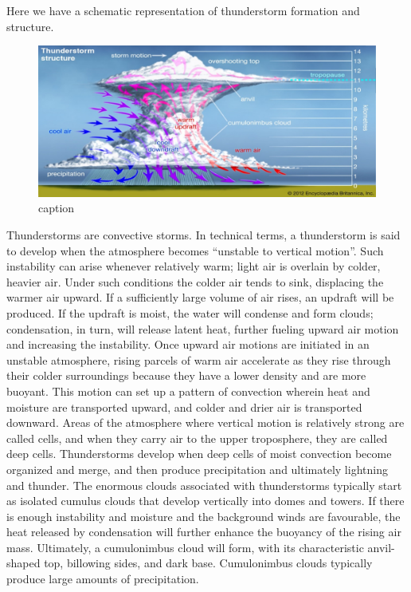 \documentclass[12pt,oneside]{book}
\begin{document}
Here we have a schematic representation of thunderstorm formation and
structure.

\begin{figure}

{\centering \includegraphics[width=0.8\linewidth]{figures/FigureE1} 

}

\caption{caption}\label{fig:Thunderstormformation}
\end{figure}

Thunderstorms are convective storms. In technical terms, a thunderstorm
is said to develop when the atmosphere becomes ``unstable to vertical
motion''. Such instability can arise whenever relatively warm; light air
is overlain by colder, heavier air. Under such conditions the colder air
tends to sink, displacing the warmer air upward. If a sufficiently large
volume of air rises, an updraft will be produced. If the updraft is
moist, the water will condense and form clouds; condensation, in turn,
will release latent heat, further fueling upward air motion and
increasing the instability. Once upward air motions are initiated in an
unstable atmosphere, rising parcels of warm air accelerate as they rise
through their colder surroundings because they have a lower density and
are more buoyant. This motion can set up a pattern of convection wherein
heat and moisture are transported upward, and colder and drier air is
transported downward. Areas of the atmosphere where vertical motion is
relatively strong are called cells, and when they carry air to the upper
troposphere, they are called deep cells. Thunderstorms develop when deep
cells of moist convection become organized and merge, and then produce
precipitation and ultimately lightning and thunder. The enormous clouds
associated with thunderstorms typically start as isolated cumulus clouds
that develop vertically into domes and towers. If there is enough
instability and moisture and the background winds are favourable, the
heat released by condensation will further enhance the buoyancy of the
rising air mass. Ultimately, a cumulonimbus cloud will form, with its
characteristic anvil-shaped top, billowing sides, and dark base.
Cumulonimbus clouds typically produce large amounts of precipitation.
\end{document}
